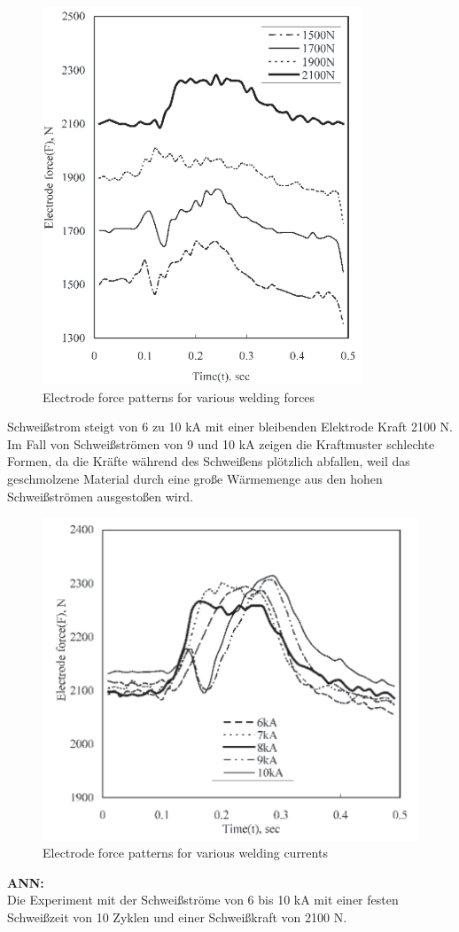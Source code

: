 \documentclass[english,ngerman]{tudscrreprt}
\begin{document}
\begin{figure}[H]
\centering
\includegraphics[scale = 0.7]{./Bilder/Electrode force patterns for various welding forces.png}
\caption{Electrode force patterns for various welding forces}\label{fgg:T}
\end{figure}
Schweißstrom steigt von 6 zu 10 kA mit einer bleibenden Elektrode Kraft 2100 N. Im Fall von Schweißströmen von 9 und 10 kA zeigen die Kraftmuster schlechte Formen, da die Kräfte während des Schweißens plötzlich abfallen, weil das geschmolzene Material durch eine große Wärmemenge aus den hohen Schweißströmen ausgestoßen wird.

\begin{figure}[H]
\centering
\includegraphics[scale = 0.7]{./Bilder/Electrode force patterns for various welding currents.png}
\caption{Electrode force patterns for various welding currents}\label{fgg:T}
\end{figure}
\noindent
\textbf{ANN: }\\ 
Die Experiment mit der Schweißströme von 6 bis 10 kA mit einer festen Schweißzeit von 10 Zyklen und einer Schweißkraft von 2100 N.
\end{document}

